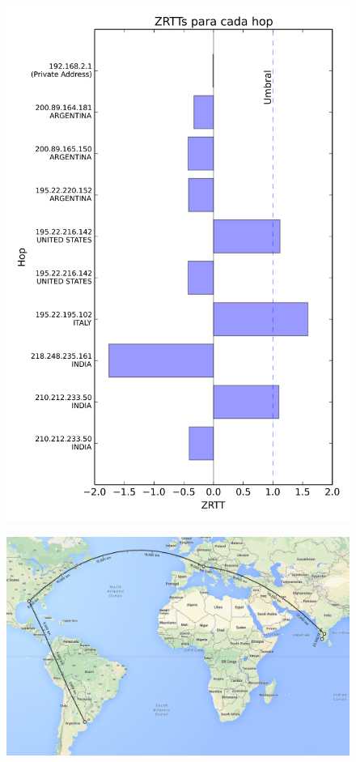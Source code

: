\begin{figure}[htp]
 \centering
 \includegraphics[scale=0.5]{imgs/cusat.png}
\end{figure}

\begin{figure}[htp]
 \centering
  \includegraphics[width=5in]{imgs/maps/cusat.png}
\end{figure}

